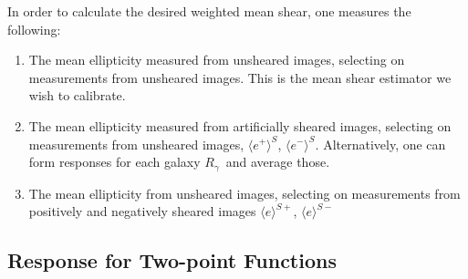 \documentclass[iop]{emulateapj}
\newcommand{\vest}{\mbox{\boldmath $e$}}
\newcommand{\mcalRpsf}{$R^{p}$}
\newcommand{\mcalRg}{\mbox{\boldmath $R_\gamma$}}
\begin{document}






In order to calculate the desired weighted mean shear, one measures the
following:
\begin{enumerate}
	\item The mean ellipticity measured from unsheared images, selecting on
        measurements from unsheared images.   This is the mean shear estimator
		we wish to calibrate.
	\item The mean ellipticity measured from artificially sheared images, selecting
        on measurements from unsheared images,  $\langle e^+ \rangle^S$, $\langle e^- \rangle^S$. Alternatively, 
        one can form responses for each galaxy \mcalRg\ and average those.
    \item The mean ellipticity from unsheared images, selecting on measurements
        from positively and negatively sheared images $\langle e \rangle^{S+}$, $\langle e \rangle^{S-}$
\end{enumerate}





\subsection{Response for Two-point Functions} \label{sec:Rtwopt}
\end{document}
